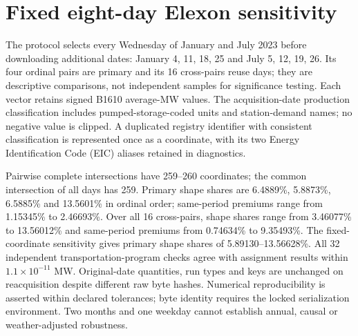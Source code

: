 \documentclass[10pt,journal,onecolumn]{IEEEtran}
\begin{document}
\section{Fixed eight-day Elexon sensitivity}
The protocol selects every Wednesday of January and July 2023 before downloading additional dates: January 4, 11, 18, 25 and July 5, 12, 19, 26. Its four ordinal pairs are primary and its 16 cross-pairs reuse days; they are descriptive comparisons, not independent samples for significance testing. Each vector retains signed B1610 average-MW values. The acquisition-date production classification includes pumped-storage-coded units and station-demand names; no negative value is clipped. A duplicated registry identifier with consistent classification is represented once as a coordinate, with its two Energy Identification Code (EIC) aliases retained in diagnostics.

Pairwise complete intersections have 259--260 coordinates; the common intersection of all days has 259. Primary shape shares are 6.4889\%, 5.8873\%, 6.5885\% and 13.5601\% in ordinal order; same-period premiums range from 1.15345\% to 2.46693\%. Over all 16 cross-pairs, shape shares range from 3.46077\% to 13.56012\% and same-period premiums from 0.74634\% to 9.35493\%. The fixed-coordinate sensitivity gives primary shape shares of 5.89130--13.56628\%. All 32 independent transportation-program checks agree with assignment results within $1.1\times10^{-11}$ MW. Original-date quantities, run types and keys are unchanged on reacquisition despite different raw byte hashes. Numerical reproducibility is asserted within declared tolerances; byte identity requires the locked serialization environment. Two months and one weekday cannot establish annual, causal or weather-adjusted robustness.
\end{document}
